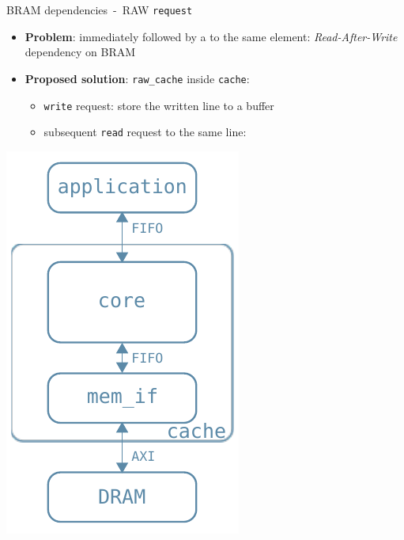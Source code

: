 \documentclass[handout,aspectratio=169]{beamer}
\begin{document}
\begin{frame}{BRAM dependencies~-~RAW \texttt{request}}
	\begin{minipage}{.7\textwidth}
		\begin{itemize}[<+->]
			\item \textbf{Problem}:
				 immediately
				followed by a 
				to the same element: \emph{Read-After-Write}
				dependency on BRAM
			\item \textbf{Proposed solution}:
				\texttt{raw\_cache} inside \texttt{cache}:
				\begin{itemize}[<.->]
					\item \texttt{write} request: store the
						written line to a buffer
					\item subsequent \texttt{read} request to
						the same line: 
				\end{itemize}
		\end{itemize}
	\end{minipage}
	\begin{minipage}{.28\textwidth}
		\begin{center}
			\includegraphics[width=.8\textwidth]{internal_arch.pdf}
		\end{center}
	\end{minipage}
\end{frame}
\end{document}
